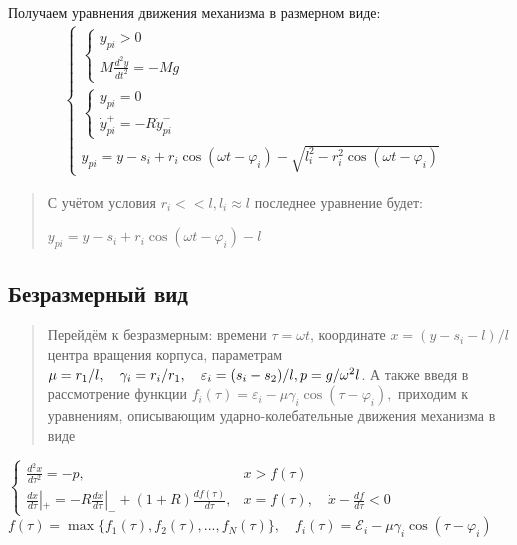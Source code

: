 Получаем уравнения движения механизма в размерном виде:
\large
\begin{align*}
\left\{
\begin{array}{ll}
\left\{
\begin{array}{l}
y_{pi} > 0 \\
M \frac{d^2 y}{dt^2} = -Mg
\end{array}
\right. & \\[2mm]
\left\{
\begin{array}{l}
y_{pi} = 0 \\
\dot{y}_{pi}^+ = -R \dot{y}_{pi}^-
\end{array}
\right. & \\[2mm]
y_{pi} = y - s_i + r_i \cos(\omega t - \varphi_i) - \sqrt{l_i^2 - r_i^2 \cos(\omega t - \varphi_i)}
\end{array}
\right.
\end{align*}
\normalsize

\begin{quotation}
С учётом условия $r_i << l, l_i \approx l$ последнее уравнение будет: 

\centering$y_{pi} = y - s_i + r_i \cos(\omega t - \varphi_i) - l$
\end{quotation}

\subsection{Безразмерный вид}

\begin{quotation}
Перейдём к безразмерным: времени $\tau = \omega t$,
координате $x = (y - s_i - l)/l$ центра вращения корпуса, параметрам
$\mu = r_1/l, \quad \gamma_i = r_i/r_1, \quad \varepsilon_i = (s_i - s_2)/l, 
\newline p = g/\omega^2 l$. А также введя в рассмотрение функции
$f_i(\tau) = \varepsilon_i - \mu \gamma_i \cos(\tau - \varphi_i),$
приходим к уравнениям, описывающим ударно-колебательные движения механизма в виде
\end{quotation}

\large
$
\begin{cases}
\frac{{d^2 x}}{{d \tau^2}} = -p, & x > f(\tau) \\[2mm]
\frac{{dx}}{{d\tau}}|_+ = -R \frac{{dx}}{{d\tau}}|_- + (1 + R) \frac{{df(\tau)}}{{d\tau}}, & x = f(\tau), \quad \dot{x} - \frac{{df}}{{d\tau}} < 0
\end{cases}
$
\\[8mm]
\large
{
$
f(\tau) = \max\{f_1(\tau), f_2(\tau), ..., f_N(\tau)\},\quad f_i(\tau) = \mathcal{E}_i - \mu \gamma_i \cos(\tau - \varphi_i)
$
}
\normalsize